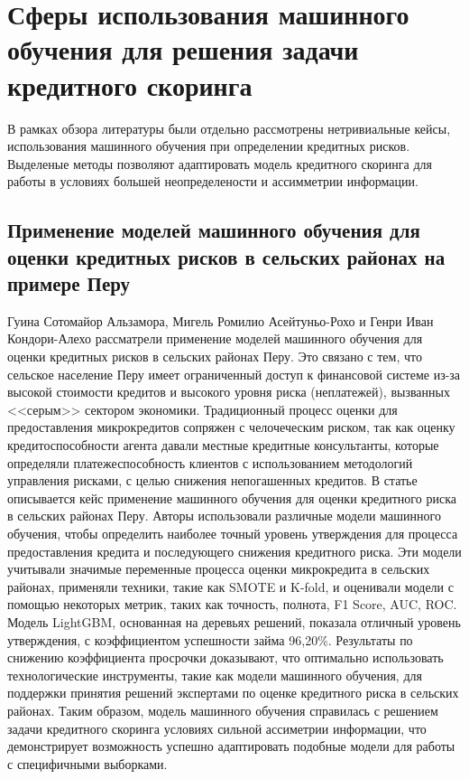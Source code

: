 \documentclass[14pt, letterpaper, twoside]{extarticle}
\begin{document}
\section{Сферы использования машинного обучения для решения задачи кредитного скоринга}

В рамках обзора литературы были отдельно рассмотрены нетривиальные кейсы, использования машинного обучения при определении кредитных рисков. Выделеные методы позволяют адаптировать модель кредитного скоринга для работы в условиях большей неопределености и ассимметрии информации.

\subsection{Применение моделей машинного обучения для оценки кредитных рисков в сельских районах на примере Перу}

Гуина Сотомайор Альзамора, Мигель Ромилио Асейтуньо-Рохо и Генри Иван Кондори-Алехо \cite{alzamora2022assertive} рассматрели применение моделей машинного обучения для оценки кредитных рисков в сельских районах Перу. Это связано с тем, что сельское население Перу имеет ограниченный доступ к финансовой системе из-за высокой стоимости кредитов и высокого уровня риска (неплатежей), вызванных <<серым>> сектором экономики. Традиционный процесс оценки для предоставления микрокредитов сопряжен с челочеческим риском, так как оценку кредитоспособности агента давали местные кредитные консультанты, которые определяли платежеспособность клиентов с использованием методологий управления рисками, с целью снижения непогашенных кредитов. В статье описывается кейс применение машинного обучения для оценки кредитного риска в сельских районах Перу. Авторы использовали различные модели машинного обучения, чтобы определить наиболее точный уровень утверждения для процесса предоставления кредита и последующего снижения кредитного риска. Эти модели учитывали значимые переменные процесса оценки микрокредита в сельских районах, применяли техники, такие как SMOTE и K-fold, и оценивали модели с помощью некоторых метрик, таких как точность, полнота, F1 Score, AUC, ROC. Модель LightGBM, основанная на деревьях решений, показала отличный уровень утверждения, с коэффициентом успешности займа 96,20\%. Результаты по снижению коэффициента просрочки доказывают, что оптимально использовать технологические инструменты, такие как модели машинного обучения, для поддержки принятия решений экспертами по оценке кредитного риска в сельских районах. Таким образом, модель машинного обучения справилась с решением задачи кредитного скоринга  условиях сильной ассиметрии информации, что демонстрирует возможность успешно адаптировать подобные модели для работы с специфичными выборками.
\end{document}
